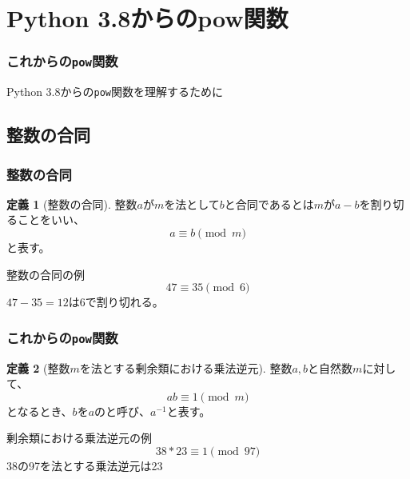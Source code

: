 \documentclass[aspectratio=169,dvipdfmx,14pt,notheorems]{beamer}
\theoremstyle{definition}
\newtheorem{definition}{定義}
\begin{document}
\section{Python 3.8からのpow関数}

\begin{frame}\frametitle{これからの\texttt{pow}関数}
\begin{center}
\Large Python 3.8からの\texttt{pow}関数を理解するために
\end{center}
\end{frame}

\subsection{整数の合同}

\begin{frame}\frametitle{整数の合同}

\begin{definition}[整数の合同]
整数$a$が$m$を法として$b$と合同であるとは$m$が$a-b$を割り切ることをいい、
\begin{equation*}
a \equiv b \pmod{m}
\end{equation*}
と表す。
\end{definition}

\begin{exampleblock}{整数の合同の例}
\begin{equation*}
47 \equiv 35 \pmod{6}
\end{equation*}
$47-35 = 12$は6で割り切れる。
\end{exampleblock}

\end{frame}

\begin{frame}\frametitle{これからの\texttt{pow}関数}

\begin{definition}[整数$m$を法とする剰余類における乗法逆元]
整数$a, b$と自然数$m$に対して、
\begin{equation*}
ab \equiv 1 \pmod{m}
\end{equation*}
となるとき、$b$を$a$のと呼び、$a^{-1}$と表す。
\end{definition}

\begin{exampleblock}{剰余類における乗法逆元の例}
\begin{equation*}
38 * 23 \equiv 1 \pmod{97}
\end{equation*}
38の97を法とする乗法逆元は23
\end{exampleblock}

\end{frame}
\end{document}
